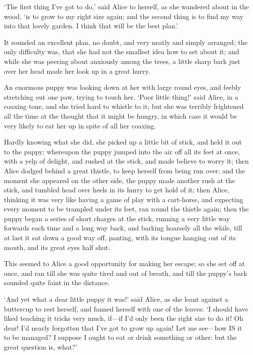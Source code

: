 \documentclass[12pt]{book}
\begin{document}
\begin{Parallel}[p]{}{}
{‘The first thing I’ve got to do,’ said Alice to herself, as she wandered about in the wood, ‘is to grow to my right size again; and the second thing is to find my way into that lovely garden. I think that will be the best plan.’

It sounded an excellent plan, no doubt, and very neatly and simply arranged; the only difficulty was, that she had not the smallest idea how to set about it; and while she was peering about anxiously among the trees, a little sharp bark just over her head made her look up in a great hurry.

An enormous puppy was looking down at her with large round eyes, and feebly stretching out one paw, trying to touch her. ‘Poor little thing!’ said Alice, in a coaxing tone, and she tried hard to whistle to it; but she was terribly frightened all the time at the thought that it might be hungry, in which case it would be very likely to eat her up in spite of all her coaxing.

Hardly knowing what she did, she picked up a little bit of stick, and held it out to the puppy; whereupon the puppy jumped into the air off all its feet at once, with a yelp of delight, and rushed at the stick, and made believe to worry it; then Alice dodged behind a great thistle, to keep herself from being run over; and the moment she appeared on the other side, the puppy made another rush at the stick, and tumbled head over heels in its hurry to get hold of it; then Alice, thinking it was very like having a game of play with a cart-horse, and expecting every moment to be trampled under its feet, ran round the thistle again; then the puppy began a series of short charges at the stick, running a very little way forwards each time and a long way back, and barking hoarsely all the while, till at last it sat down a good way off, panting, with its tongue hanging out of its mouth, and its great eyes half shut.

This seemed to Alice a good opportunity for making her escape; so she set off at once, and ran till she was quite tired and out of breath, and till the puppy’s bark sounded quite faint in the distance.

‘And yet what a dear little puppy it was!’ said Alice, as she leant against a buttercup to rest herself, and fanned herself with one of the leaves: ‘I should have liked teaching it tricks very much, if—if I’d only been the right size to do it! Oh dear! I’d nearly forgotten that I’ve got to grow up again! Let me see—how IS it to be managed? I suppose I ought to eat or drink something or other; but the great question is, what?’

}
\end{Parallel}
\end{document}
